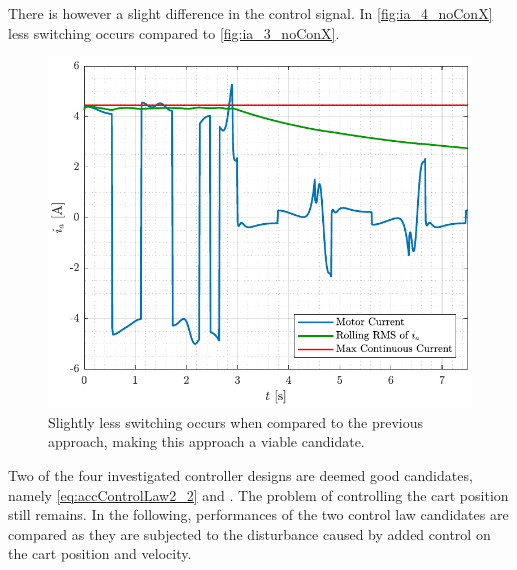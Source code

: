 %
There is however a slight difference in the control signal. In \autoref{fig:ia_4_noConX} less switching occurs compared to \autoref{fig:ia_3_noConX}. 
\begin{figure}[H]
  \includegraphics[width=.52\textwidth]{figures/ia_4_noConX}
  \caption{Slightly less switching occurs when compared to the previous approach, making this approach a viable candidate.}
  \label{fig:ia_4_noConX}
\end{figure}
%
Two of the four investigated controller designs are deemed good candidates, namely \autoref{eq:accControlLaw2_2} and . The problem of controlling the cart position still remains. In the following, performances of the two control law candidates are compared as they are subjected to the disturbance caused by added control on the cart position and velocity.
%
%

